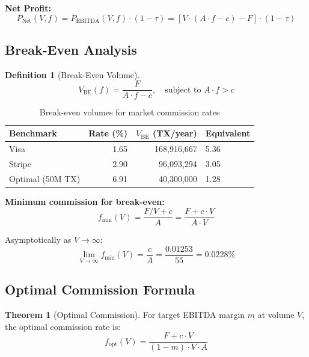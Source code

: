 \documentclass[12pt,a4paper]{article}
\theoremstyle{definition}
\newtheorem{definition}{Definition}[section]
\newtheorem{theorem}{Theorem}[section]
\theoremstyle{remark}
\newcommand{\TPS}{\text{TPS}}
\DeclareMathOperator{\EBITDA}{EBITDA}
\begin{document}
\textbf{Net Profit:}
\begin{equation}
\label{eq:net-profit}
P_{\text{Net}}(V, f) = P_{\EBITDA}(V, f) \cdot (1 - \tau) = [V \cdot (A \cdot f - c) - F] \cdot (1 - \tau)
\end{equation}

\subsection{Break-Even Analysis}

\begin{definition}[Break-Even Volume]
\begin{equation}
\label{eq:break-even}
V_{\text{BE}}(f) = \frac{F}{A \cdot f - c}, \quad \text{subject to } A \cdot f > c
\end{equation}
\end{definition}

\begin{table}[H]
\centering
\caption{Break-even volumes for market commission rates}
\label{tab:breakeven}
\begin{tabular}{lrrl}
\toprule
\textbf{Benchmark} & \textbf{Rate (\%)} & \textbf{$V_{\text{BE}}$ (TX/year)} & \textbf{Equivalent \TPS{}} \\
\midrule
Visa & 1.65 & 168{,}916{,}667 & 5.36 \\
Stripe & 2.90 & 96{,}093{,}294 & 3.05 \\
Optimal (50M TX) & 6.91 & 40{,}300{,}000 & 1.28 \\
\bottomrule
\end{tabular}
\end{table}

\textbf{Minimum commission for break-even:}
\begin{equation}
\label{eq:min-fee}
f_{\min}(V) = \frac{F/V + c}{A} = \frac{F + c \cdot V}{A \cdot V}
\end{equation}

Asymptotically as $V \to \infty$:
\begin{equation}
\lim_{V \to \infty} f_{\min}(V) = \frac{c}{A} = \frac{0.01253}{55} = 0.0228\%
\end{equation}

\subsection{Optimal Commission Formula}

\begin{theorem}[Optimal Commission]
\label{thm:optimal-commission}
For target EBITDA margin $m$ at volume $V$, the optimal commission rate is:
\begin{equation}
\label{eq:optimal-fee}
f_{\text{opt}}(V) = \frac{F + c \cdot V}{(1 - m) \cdot V \cdot A}
\end{equation}
\end{theorem}
\end{document}
